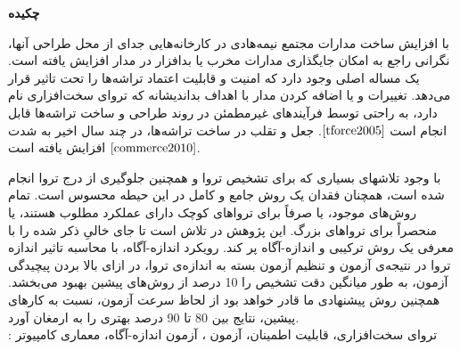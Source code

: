 

\pagestyle{plain}

\begin{center}
	\textbf{چکیده}
\end{center}


\noindent
با افزایش ساخت مدارات مجتمع نیمه‌ها‌‌دی در کارخانه‌هایی جدای از محل طراحی آنها، نگرانی راجع به امکان جایگذاری مدارات مخرب یا بدافزار در مدار افزایش یافته است. یک مساله اصلی وجود دارد که امنیت و قابلیت اعتماد تراشه‌ها را تحت تاثیر قرار می‌دهد. تغییرات و یا اضافه کردن مدار با اهداف بداندیشانه که تروای سخت‌افزاری نام دارد، به راحتی توسط فرآیندهای غیرمطمئن در روند طراحی و ساخت تراشه‌ها قابل انجام است
$ \cite{tforce2005}$.
جعل و تقلب در ساخت تراشه‌ها، در چند سال اخیر به شدت افزایش یافته است 
$\cite{commerce2010}$.

با وجود تلاشهای بسیاری که برای تشخیص تروا و همچنین جلوگیری از درج تروا انجام شده است، همچنان فقدان یک روش جامع و کامل در این حیطه محسوس است.  تمام روش‌های موجود، یا صرفاً برای تروا‌های کوچک دارای عملکرد مطلوب هستند، یا منحصراً برای تروا‌های بزرگ. این پژوهش در تلاش است تا جای خالیِ ذکر شده را با معرفی یک روش ترکیبی و اندازه-آگاه پر کند. رویکرد اندازه-آگاه، با محاسبه تاثیر اندازه تروا در نتیجه‌ی آزمون و تنظیم آزمون بسته به اندازه‌ی تروا، در ازای بالا بردن پیچیدگی آزمون، به طور میانگین دقت تشخیص را 10 درصد از روش‌های پیشین بهبود می‌بخشد. همچنین روش پیشنهادی ما قادر خواهد بود از لحاظ سرعت آزمون، نسبت به کارهای پیشین، نتایج بین 80 تا 90 درصد بهتری را به ارمغان آورد.\\


: 
تروای سخت‌افزاری، قابلیت اطمینان، آزمون
 ،
  آزمون اندازه-آگاه، معماری کامپیوتر
\newpage


